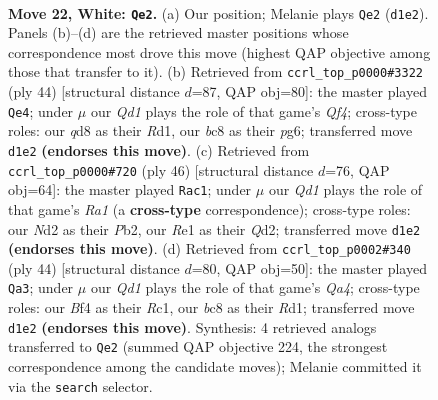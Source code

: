 \documentclass[11pt]{article}
\begin{document}
\clearpage

\begin{figure}[p]\centering
\begin{subfigure}{0.46\textwidth}\centering
\resizebox{\linewidth}{!}{%
\newchessgame
\chessboard[
  setfen={r1bqk1r1/5p2/1p2pnp1/p1b4p/P4B1P/1P1B2P1/2PN1PK1/R2QR3 w q - 11 22},
  showmover=false,
  pgfstyle=straightmove, color=movearrow, markmove={d1-e2}
]}
\caption{}
\end{subfigure}\hfill
\begin{subfigure}{0.46\textwidth}\centering
\resizebox{\linewidth}{!}{%
\newchessgame
\chessboard[
  setfen={5bkr/r1qn1p1p/p3p1p1/2p1P3/1pP2Q2/1P2B1P1/5PBP/R2R2K1 w - - 0 23},
  showmover=false,
  pgfstyle=straightmove, color=movearrow, markmove={f4-e4}
]}
\caption{}
\end{subfigure}
\\[4pt]
\begin{subfigure}{0.46\textwidth}\centering
\resizebox{\linewidth}{!}{%
\newchessgame
\chessboard[
  setfen={2rr2k1/3nqpp1/1p2p2p/pPbpP3/5P1P/2B3P1/1P1QP1BK/R2R4 w - - 1 24},
  showmover=false,
  pgfstyle=straightmove, color=movearrow, markmove={a1-c1}
]}
\caption{}
\end{subfigure}\hfill
\begin{subfigure}{0.46\textwidth}\centering
\resizebox{\linewidth}{!}{%
\newchessgame
\chessboard[
  setfen={2r3k1/p2rqpb1/1p1p1np1/1P2pb1p/QBP5/4P2P/P2NBPP1/2RR2K1 w - - 1 23},
  showmover=false,
  pgfstyle=straightmove, color=movearrow, markmove={a4-a3}
]}
\caption{}
\end{subfigure}
\caption{\textbf{Move 22, White: \texttt{Qe2}.} (a) Our position; Melanie plays \texttt{Qe2} (\texttt{d1e2}). Panels (b)--(d) are the retrieved master positions whose correspondence most drove this move (highest QAP objective among those that transfer to it). (b) Retrieved from \texttt{ccrl\_top\_p0000\#3322} (ply 44) [structural distance $d$=87, QAP obj=80]: the master played \texttt{Qe4}; under $\mu$ our \emph{Qd1} plays the role of that game's \emph{Qf4}; cross-type roles: our \emph{q}d8 as their \emph{R}d1, our \emph{b}c8 as their \emph{p}g6; transferred move \texttt{d1e2} \textbf{(endorses this move)}. (c) Retrieved from \texttt{ccrl\_top\_p0000\#720} (ply 46) [structural distance $d$=76, QAP obj=64]: the master played \texttt{Rac1}; under $\mu$ our \emph{Qd1} plays the role of that game's \emph{Ra1} (a \textbf{cross-type} correspondence); cross-type roles: our \emph{N}d2 as their \emph{P}b2, our \emph{R}e1 as their \emph{Q}d2; transferred move \texttt{d1e2} \textbf{(endorses this move)}. (d) Retrieved from \texttt{ccrl\_top\_p0002\#340} (ply 44) [structural distance $d$=80, QAP obj=50]: the master played \texttt{Qa3}; under $\mu$ our \emph{Qd1} plays the role of that game's \emph{Qa4}; cross-type roles: our \emph{B}f4 as their \emph{R}c1, our \emph{b}c8 as their \emph{R}d1; transferred move \texttt{d1e2} \textbf{(endorses this move)}. Synthesis: 4 retrieved analogs transferred to \texttt{Qe2} (summed QAP objective 224, the strongest correspondence among the candidate moves); Melanie committed it via the \texttt{search} selector.}
\label{fig:thought-m42}
\end{figure}
\end{document}
